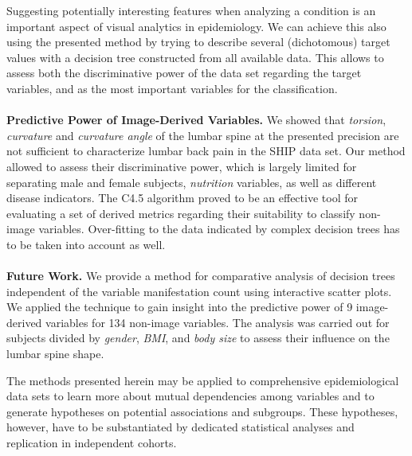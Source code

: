 \documentclass[a4paper,twoside]{style/article}
\begin{document}
Suggesting potentially interesting features when analyzing a condition is an important aspect of visual analytics in epidemiology.
We can achieve this also using the presented method by trying to describe several (dichotomous) target values with a decision tree constructed from all available data.
This allows to assess both the discriminative power of the data set regarding the target variables, and as the most important variables for the classification.
\\\\
\noindent \textbf{Predictive Power of Image-Derived Variables.}
We showed that \emph{torsion}, \emph{curvature} and \emph{curvature angle} of the lumbar spine at the presented precision are not sufficient to characterize lumbar back pain in the SHIP data set.
Our method allowed to assess their discriminative power, which is largely limited for separating male and female subjects, \emph{nutrition} variables, as well as different disease indicators.
The C4.5 algorithm proved to be an effective tool for evaluating a set of derived metrics regarding their suitability to classify non-image variables.
Over-fitting to the data indicated by complex decision trees has to be taken into account as well.
\\\\
\noindent \textbf{Future Work.}
We provide a method for comparative analysis of decision trees independent of the variable manifestation count using interactive scatter plots.
We applied the technique to gain insight into the predictive power of 9 image-derived variables for 134 non-image variables.
The analysis was carried out for subjects divided by \emph{gender}, \emph{BMI}, and \emph{body size} to assess their influence on the lumbar spine shape.

The methods presented herein may be applied to comprehensive epidemiological data sets to learn more about mutual dependencies among variables and to generate hypotheses on potential associations and subgroups.
%
These hypotheses, however, have to be substantiated by dedicated statistical analyses and replication in independent cohorts.
\end{document}
